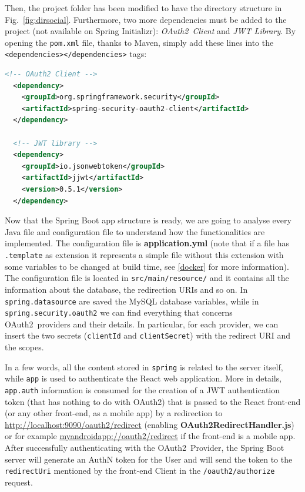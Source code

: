 \documentclass[a4paper,12pt]{article}
\def\oauth{OAuth2\xspace}
\def\myfig#1{Fig.~#1\xspace}
\begin{document}
Then, the project folder has been modified to have the directory structure in \myfig{\ref{fig:dirsocial}}. Furthermore, two more dependencies must be added to the project (not available on Spring Initializr): \textit{\oauth\ Client} and \textit{JWT Library}. By opening the \texttt{pom.xml} file, thanks to Maven, simply add these lines into the \texttt{<dependencies></dependencies>} tags:

\begin{lstlisting}[language=XML, basicstyle=\ttfamily]
  <!-- OAuth2 Client -->
  <dependency>
    <groupId>org.springframework.security</groupId>
    <artifactId>spring-security-oauth2-client</artifactId>
  </dependency>

  <!-- JWT library -->
  <dependency>
    <groupId>io.jsonwebtoken</groupId>
    <artifactId>jjwt</artifactId>
    <version>0.5.1</version>
  </dependency>
\end{lstlisting}

Now that the Spring Boot app structure is ready, we are going to analyse every Java file and configuration file to understand how the functionalities are implemented. The configuration file is \textbf{application.yml} (note that if a file has \texttt{.template} as extension it represents a simple file without this extension with some variables to be changed at build time, see \ref{docker} for more information). The configuration file is located in \texttt{src/main/resource/} and it contains all the information about the database, the redirection URIs and so on. In \texttt{spring.datasource} are saved the MySQL database variables, while in \texttt{spring.security.oauth2} we can find everything that concerns \oauth\ providers and their details. In particular, for each provider, we can insert the two secrets (\texttt{clientId} and \texttt{clientSecret}) with the redirect URI and the scopes.

In a few words, all the content stored in \texttt{spring} is related to the server itself, while \texttt{app} is used to authenticate the React web application. More in details, \texttt{app.auth} information is consumed for the creation of a JWT authentication token (that has nothing to do with \oauth) that is passed to the React front-end (or any other front-end, as a mobile app) by a redirection to \\ \url{http://localhost:9090/oauth2/redirect} (enabling \textbf{OAuth2RedirectHandler.js}) or for example \url{myandroidapp://oauth2/redirect} if the front-end is a mobile app.
After successfully authenticating with the \oauth\ Provider, the Spring Boot server will generate an AuthN token for the User and will send the token to the \texttt{redirectUri} mentioned by the front-end Client in the \texttt{/oauth2/authorize} request. 
\end{document}
